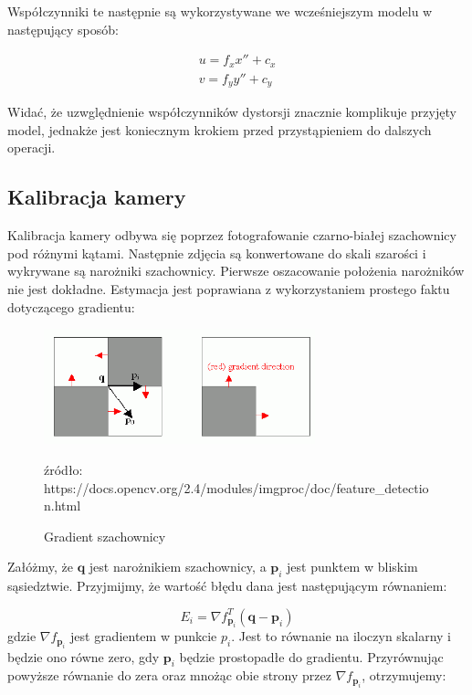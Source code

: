 \documentclass[oneside, eng]{mgr}
\newcommand{\bb}{\textbf}
\begin{document}
Współczynniki te następnie są wykorzystywane we wcześniejszym modelu w następujący sposób:

\begin{gather*}
	u = f_x x'' + c_x \\
	v = f_y y'' + c_y
\end{gather*}

Widać, że uzwględnienie współczynników dystorsji znacznie komplikuje przyjęty model, jednakże jest koniecznym krokiem przed przystąpieniem do dalszych operacji.

\subsection{Kalibracja kamery}

Kalibracja kamery odbywa się poprzez fotografowanie czarno-białej szachownicy pod różnymi kątami. Następnie zdjęcia są konwertowane do skali szarości i wykrywane są narożniki szachownicy. Pierwsze oszacowanie położenia narożników nie jest dokładne. Estymacja jest poprawiana z wykorzystaniem prostego faktu dotyczącego gradientu:

\begin{figure}
\centering
	\includegraphics[width=0.70\textwidth]{cornersubpix.png}\par\vspace{1cm}
\caption{Gradient szachownicy}
źródło: https://docs.opencv.org/2.4/modules/imgproc/doc/feature\_detection.html
	\label{fig:gradient}
\end{figure}

Załóżmy, że $\bb{q}$ jest narożnikiem szachownicy, a $\bb{p}_i$ jest punktem w bliskim sąsiedztwie. Przyjmijmy, że wartość błędu dana jest następującym równaniem:

\begin{equation}
	E_i = \nabla f_{\bb{p}_i}^T (\bb{q} - \bb{p}_i)
\end{equation}
gdzie $\nabla f_{\bb{p}_i}$ jest gradientem w punkcie $p_i$. Jest to równanie na iloczyn skalarny i będzie ono równe zero, gdy $\bb{p}_i$ będzie prostopadłe do gradientu. Przyrównując powyższe równanie do zera oraz mnożąc obie strony przez $\nabla f_{\bb{p}_i}$, otrzymujemy:
\end{document}
